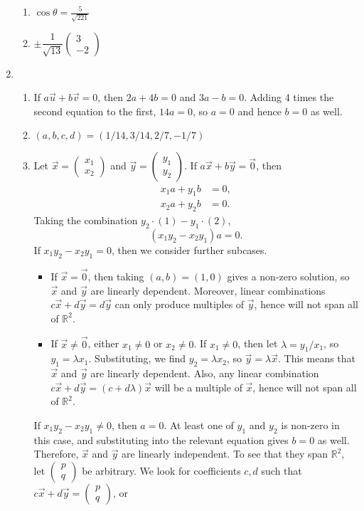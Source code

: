 \begin{enumerate}
\begin{enumerate}
\item $\cos\theta = \frac{5}{\sqrt{221}}$
\item $\pm\dfrac{1}{\sqrt{13}}\begin{pmatrix} 3 \\ -2 \end{pmatrix}$
\end{enumerate}
\item \begin{enumerate}
\item If $a\vec{u} + b\vec{v} = 0$, then $2a + 4b = 0$ and $3a - b = 0$. Adding 4 times the second equation to the first, $14a = 0$, so $a = 0$ and hence $b = 0$ as well.
\item $(a,b,c,d) = (1/14, 3/14, 2/7, -1/7)$
\item Let $\vec{x} = \begin{pmatrix} x_1 \\ x_2 \end{pmatrix}$ and $\vec{y} = \begin{pmatrix} y_1 \\ y_2 \end{pmatrix}$. If $a\vec{x} + b\vec{y} = \vec{0}$, then
\begin{align}
x_1a + y_1b &= 0, \\
x_2a + y_2b &= 0.
\end{align}
Taking the combination $y_2\cdot (1) - y_1\cdot (2)$,
\begin{equation*}
(x_1y_2 - x_2y_1)a = 0.
\end{equation*}
If $x_1y_2 - x_2y_1 = 0$, then we consider further subcases.
\begin{itemize}
\item If $\vec{x} = \vec{0}$, then taking $(a,b) = (1,0)$ gives a non-zero solution, so $\vec{x}$ and $\vec{y}$ are linearly dependent. Moreover, linear combinations $c\vec{x} + d\vec{y} = d\vec{y}$ can only produce multiples of $\vec{y}$, hence will not span all of $\mathbb{R}^2$.
\item If $\vec{x}\neq\vec{0}$, either $x_1\neq 0$ or $x_2\neq 0$. If $x_1\neq 0$, then let $\lambda = y_1/x_1$, so $y_1 = \lambda x_1$. Substituting, we find $y_2 = \lambda x_2$, so $\vec{y} = \lambda\vec{x}$. This means that $\vec{x}$ and $\vec{y}$ are linearly dependent. Also, any linear combination $c\vec{x} + d\vec{y} = (c + d\lambda)\vec{x}$ will be a multiple of $\vec{x}$, hence will not span all of $\mathbb{R}^2$.
\end{itemize}
If $x_1y_2 - x_2y_1\neq 0$, then $a = 0$. At least one of $y_1$ and $y_2$ is non-zero in this case, and substituting into the relevant equation gives $b = 0$ as well. Therefore, $\vec{x}$ and $\vec{y}$ are linearly independent. To see that they span $\mathbb{R}^2$, let $\begin{pmatrix} p \\ q \end{pmatrix}$ be arbitrary. We look for coefficients $c,d$ such that $c\vec{x} + d\vec{y} = \begin{pmatrix} p \\ q \end{pmatrix}$, or

\end{enumerate}
\end{enumerate}
